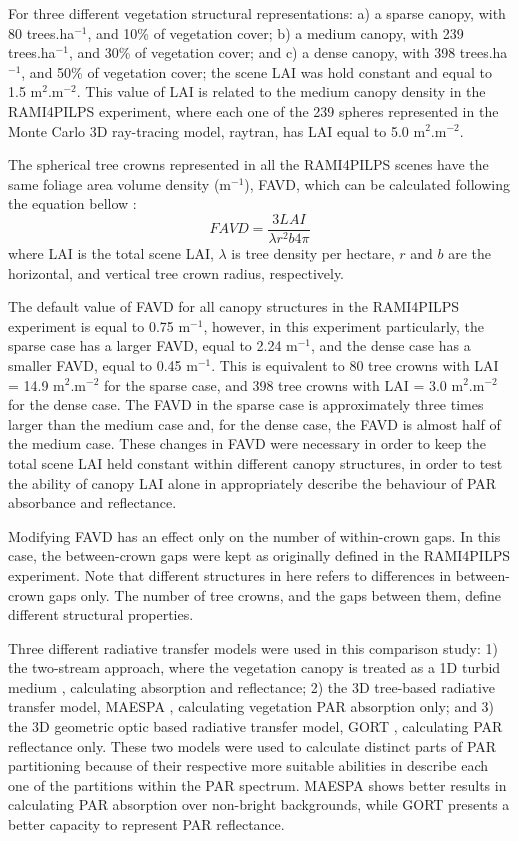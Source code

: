 For three different vegetation structural representations: a) a sparse canopy, with 80 trees.ha$^{-1}$, and 10\% of vegetation cover; b) a medium canopy, with 239 trees.ha$^{-1}$, and 30\% of vegetation cover; and c) a dense canopy, with 398 trees.ha$^{-1}$, and 50\% of vegetation cover; the scene LAI was hold constant and equal to 1.5 m$^2$.m$^{-2}$. This value of LAI is related to the medium canopy density in the RAMI4PILPS experiment, where each one of the 239 spheres represented in the Monte Carlo 3D ray-tracing model, raytran, has LAI equal to 5.0 m$^2$.m$^{-2}$. 

The spherical tree crowns represented in all the RAMI4PILPS scenes have the same foliage area volume density (m$^{-1}$), FAVD, which can be calculated following the equation bellow \citep{quaife2008}:
\begin{equation}
 FAVD = \frac{3 LAI}{\lambda r^2 b 4 \pi}
\end{equation}\label{equation:favd}
\noindent where LAI is the total scene LAI, $\lambda$ is tree density per hectare, $r$ and $b$ are the horizontal, and vertical tree crown radius, respectively.

The default value of FAVD for all canopy structures in the RAMI4PILPS experiment is equal to 0.75 m$^{-1}$, however, in this experiment particularly, the sparse case has a larger FAVD, equal to 2.24 m$^{-1}$, and the dense case has a smaller FAVD, equal to 0.45 m$^{-1}$. This is equivalent to 80 tree crowns with LAI = 14.9 m$^2$.m$^{-2}$ for the sparse case, and 398 tree crowns with LAI = 3.0 m$^2$.m$^{-2}$ for the dense case. The FAVD in the sparse case is approximately three times larger than the medium case and, for the dense case, the FAVD is almost half of the medium case. These changes in FAVD were necessary in order to keep the total scene LAI held constant within different canopy structures, in order to test the ability of canopy LAI alone in appropriately describe the behaviour of PAR absorbance and reflectance.

Modifying FAVD has an effect only on the number of within-crown gaps. In this case, the between-crown gaps were kept as originally defined in the RAMI4PILPS experiment. Note that different structures in here refers to differences in between-crown gaps only. The number of tree crowns, and the gaps between them, define different structural properties.

Three different radiative transfer models were used in this comparison study: 1) the two-stream approach, where the vegetation canopy is treated as a 1D turbid medium \citep{Sellers1985}, calculating absorption and reflectance; 2) the 3D tree-based radiative transfer model, MAESPA \citep{Duursma2012}, calculating vegetation PAR absorption only; and 3) the 3D geometric optic based radiative transfer model, GORT \citep{Ni1997}, calculating PAR reflectance only. These two models were used to calculate distinct parts of PAR partitioning because of their respective more suitable abilities in describe each one of the partitions within the PAR spectrum. MAESPA shows better results in calculating PAR absorption over non-bright backgrounds, while GORT presents a better capacity to represent PAR reflectance.

